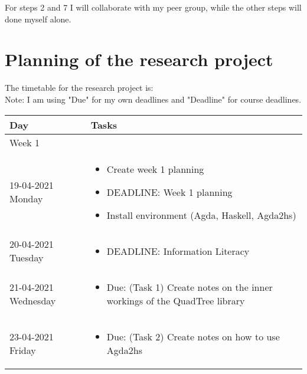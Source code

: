 \documentclass[english]{article}
\begin{document}
For steps 2 and 7 I will collaborate with my peer group, while the other steps will done myself alone.

\section*{Planning of the research project}
The timetable for the research project is: \\
Note: I am using "Due" for my own deadlines and "Deadline" for course deadlines.

\begin{center}
\begin{tabular}{| p{} | p{} | }
\hline
Day                  & Tasks                              \\
\hline

\multicolumn{2}{l}{Week 1} \\
\hline

19-04-2021 Monday    & 
\begin{minipage}[t]{0.65\textwidth} \begin{itemize}
    \item Create week 1 planning
    \item DEADLINE: Week 1 planning
    \item Install environment (Agda, Haskell, Agda2hs)
\end{itemize} \end{minipage} \\   
\hline

20-04-2021 Tuesday    & 
\begin{minipage}[t]{0.65\textwidth} \begin{itemize}
    \item DEADLINE: Information Literacy
\end{itemize} \end{minipage} \\   
\hline

21-04-2021 Wednesday    & 
\begin{minipage}[t]{0.65\textwidth} \begin{itemize}
    \item Due: (Task 1) Create notes on the inner workings of the QuadTree library
\end{itemize} \end{minipage} \\   
\hline

23-04-2021 Friday    & 
\begin{minipage}[t]{0.65\textwidth} \begin{itemize}
    \item Due: (Task 2) Create notes on how to use Agda2hs
\end{itemize} \end{minipage} \\   
\hline


\end{tabular}
\end{center}
\end{document}

